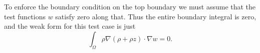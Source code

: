 \documentclass[11pt]{article}
\newcommand{\grad}{\nabla}
\begin{document}
To enforce the boundary condition on the top boundary we must assume that the test functions $w$ satisfy zero along that.  Thus the entire boundary integral is zero, and the weak form for this test case is just
\begin{equation}
\int_\Omega \rho \grad\left(\rho + \rho z\right) \cdot \grad w = 0.\label{eq:pm:weak}
\end{equation}
\end{document}

